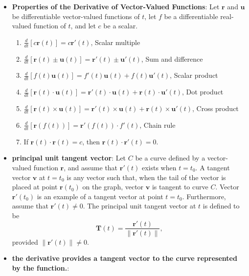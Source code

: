 \documentclass{report}
\begin{document}
\begin{itemize}
\begin{itemize}
           \end{itemize}
           \pagebreak 
       \item \textbf{Properties of the Derivative of Vector-Valued Functions}:
           Let $\mathbf{r}$ and $\mathbf{u}$ be differentiable vector-valued functions of $t$, let $f$ be a differentiable real-valued function of $t$, and let $c$ be a scalar.
           \begin{enumerate}
               \item $\frac{d}{dt}[c\mathbf{r}(t)] = c\mathbf{r}'(t)$, Scalar multiple
               \item $\frac{d}{dt}[\mathbf{r}(t) \pm \mathbf{u}(t)] = \mathbf{r}'(t) \pm \mathbf{u}'(t)$, Sum and difference
               \item $\frac{d}{dt}[f(t)\mathbf{u}(t)] = f'(t)\mathbf{u}(t) + f(t)\mathbf{u}'(t)$, Scalar product
               \item $\frac{d}{dt}[\mathbf{r}(t) \cdot \mathbf{u}(t)] = \mathbf{r}'(t) \cdot \mathbf{u}(t) + \mathbf{r}(t) \cdot \mathbf{u}'(t)$, Dot product
               \item $\frac{d}{dt}[\mathbf{r}(t) \times \mathbf{u}(t)] = \mathbf{r}'(t) \times \mathbf{u}(t) + \mathbf{r}(t) \times \mathbf{u}'(t)$, Cross product
               \item $\frac{d}{dt}[\mathbf{r}(f(t))] = \mathbf{r}'(f(t)) \cdot f'(t)$, Chain rule
               \item If $\mathbf{r}(t) \cdot \mathbf{r}(t) = c$, then $\mathbf{r}(t) \cdot \mathbf{r}'(t) = 0$.
           \end{enumerate}
       \item \textbf{principal unit tangent vector}:
           Let $C$ be a curve defined by a vector-valued function $\mathbf{r}$, and assume that $\mathbf{r}'(t)$ exists when $t = t_0$. A tangent vector $\mathbf{v}$ at $t = t_0$ is any vector such that, when the tail of the vector is placed at point $\mathbf{r}(t_0)$ on the graph, vector $\mathbf{v}$ is tangent to curve $C$. Vector $\mathbf{r}'(t_0)$ is an example of a tangent vector at point $t = t_0$. Furthermore, assume that $\mathbf{r}'(t) \neq 0$. The principal unit tangent vector at $t$ is defined to be
           \begin{equation}
               \mathbf{T}(t) = \frac{\mathbf{r}'(t)}{\|\mathbf{r}'(t)\|},
           \end{equation}
           provided $\|\mathbf{r}'(t)\| \neq 0.$
        \item \textbf{the derivative provides a tangent vector to the curve represented by the function.}: 

\end{itemize}
\end{document}
